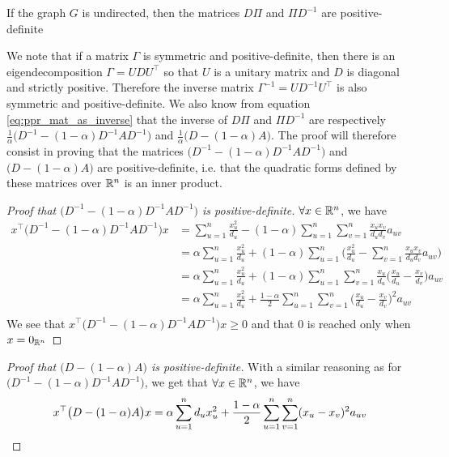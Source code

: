 \begin{theorem}\label{th:dpi_pidm_symdefpos}
    If the graph $G$ is undirected, then the matrices $D\Pi$ and $\Pi D^{-1}$ are positive-definite
\end{theorem}
We note that if a matrix $\Gamma$ is symmetric and positive-definite, then there is an eigendecomposition $\Gamma = U D U^\top$ so that $U$ is a unitary matrix and $D$ is diagonal and strictly positive. Therefore the inverse matrix $\Gamma^{-1} = U D^{-1} U^\top$ is also symmetric and positive-definite. We also know from equation \ref{eq:ppr_mat_as_inverse} that the inverse of $D\Pi$ and $\Pi D^{-1}$ are respectively $\frac{1}{\alpha} \big(D^{-1} - (1-\alpha)D^{-1} A D^{-1}\big)$ and $\frac{1}{\alpha} \big(D - (1-\alpha)A\big)$. The proof will therefore consist in proving that the matrices $\big(D^{-1} - (1-\alpha)D^{-1} A D^{-1}\big)$ and $\big(D - (1-\alpha)A\big)$ are positive-definite, i.e. that the quadratic forms defined by these matrices over $\mathbb{R}^n$ is an inner product.

\begin{proof}[Proof that $\big(D^{-1} - (1-\alpha)D^{-1} A D^{-1}\big)$ is positive-definite]

    $\forall x \in \mathbb{R}^n$, we have
    \begin{equation*}
        \begin{split}
            x^\top \big(D^{-1} - (1-\alpha)D^{-1} A D^{-1}\big) x &= \sum_{u=1}^n \frac{x_u^2}{d_u} - (1-\alpha)\sum_{u=1}^n \sum_{v=1}^n \frac{x_u x_v}{d_u d_v} a_{uv}\\
            & = \alpha \sum_{u=1}^n \frac{x_u^2}{d_u} + (1-\alpha)\sum_{u=1}^n\big(\frac{x_u^2}{d_u} - \sum_{v=1}^n \frac{x_u x_v}{d_u d_v} a_{uv}\big)\\
            & = \alpha \sum_{u=1}^n \frac{x_u^2}{d_u} + (1-\alpha)\sum_{u=1}^n\sum_{v=1}^n\frac{x_u}{d_u}\big(\frac{x_u}{d_u} - \frac{x_v}{d_v}\big)a_{uv}\\
            & = \alpha \sum_{u=1}^n \frac{x_u^2}{d_u} + \frac{1-\alpha}{2}\sum_{u=1}^n\sum_{v=1}^n\big(\frac{x_u}{d_u} - \frac{x_v}{d_v}\big)^2a_{uv}\\
        \end{split}
    \end{equation*}
    We see that $x^\top \big(D^{-1} - (1-\alpha)D^{-1} A D^{-1}\big) x \geq 0$ and that $0$ is reached only when $x=0_{\mathbb{R}^n}$
\end{proof}

\begin{proof}[Proof that $\big(D - (1-\alpha) A\big)$ is positive-definite]

With a similar reasoning as for $\big(D^{-1} - (1-\alpha)D^{-1} A D^{-1}\big)$, we get that $\forall x \in \mathbb{R}^n$, we have
\begin{equation*}
    x^\top\big(D - (1-\alpha) A\big)x = \alpha \sum_{u=1}^n d_u x_u^2 + \frac{1-\alpha}{2}\sum_{u=1}^n\sum_{v=1}^n(x_u - x_v)^2a_{uv}\\ 
\end{equation*}
\end{proof}


